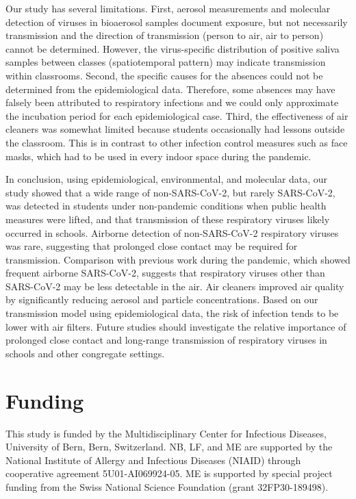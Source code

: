 \documentclass[fleqn,11pt]{wlscirep}
\begin{document}

Our study has several limitations. First, aerosol measurements and molecular detection of viruses in bioaerosol samples document exposure, but not necessarily transmission and the direction of transmission (person to air, air to person) cannot be determined. However, the virus-specific distribution of positive saliva samples between classes (spatiotemporal pattern) may indicate transmission within classrooms. Second, the specific causes for the absences could not be determined from the epidemiological data. Therefore, some absences may have falsely been attributed to respiratory infections and we could only approximate the incubation period for each epidemiological case. Third, the effectiveness of air cleaners was somewhat limited because students occasionally had lessons outside the classroom. This is in contrast to other infection control measures such as face masks, which had to be used in every indoor space during the pandemic.


In conclusion, using epidemiological, environmental, and molecular data, our study showed that a wide range of non-SARS-CoV-2, but rarely SARS-CoV-2, was detected in students under non-pandemic conditions when public health measures were lifted, and that transmission of these respiratory viruses likely occurred in schools. Airborne detection of non-SARS-CoV-2 respiratory viruses was rare, suggesting that prolonged close contact may be required for transmission. Comparison with previous work during the pandemic, which showed frequent airborne SARS-CoV-2, suggests that respiratory viruses other than SARS-CoV-2 may be less detectable in the air. Air cleaners improved air quality by significantly reducing aerosol and particle concentrations. Based on our transmission model using epidemiological data, the risk of infection tends to be lower with air filters. Future studies should investigate the relative importance of prolonged close contact and long-range transmission of respiratory viruses in schools and other congregate settings.

\newpage


\section*{Funding}
This study is funded by the Multidisciplinary Center for Infectious Diseases, University of Bern, Bern, Switzerland. NB, LF, and ME are supported by the National Institute of Allergy and Infectious Diseases (NIAID) through cooperative agreement 5U01-AI069924-05. ME is supported by special project funding from the Swiss National Science Foundation (grant 32FP30-189498). \medskip
\end{document}
